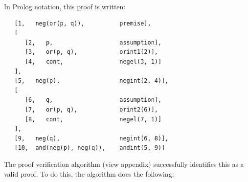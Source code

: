 \documentclass[a4paper, 11pt]{article}
\begin{document}
   In Prolog notation, this proof is written:

\begin{verbatim}
   [1,   neg(or(p, q)),          premise],
   [
      [2,   p,                   assumption],
      [3,   or(p, q),            orint1(2)],
      [4,   cont,                negel(3, 1)]
   ],
   [5,   neg(p),                 negint(2, 4)],
   [
      [6,   q,                   assumption],
      [7,   or(p, q),            orint2(6)],
      [8,   cont,                negel(7, 1)]
   ],
   [9,   neg(q),                 negint(6, 8)],
   [10,  and(neg(p), neg(q)),    andint(5, 9)]
\end{verbatim}

   The proof verification algorithm (view appendix)
   successfully identifies this as a valid proof. To do this,
   the algorithm does the following:
\end{document}
